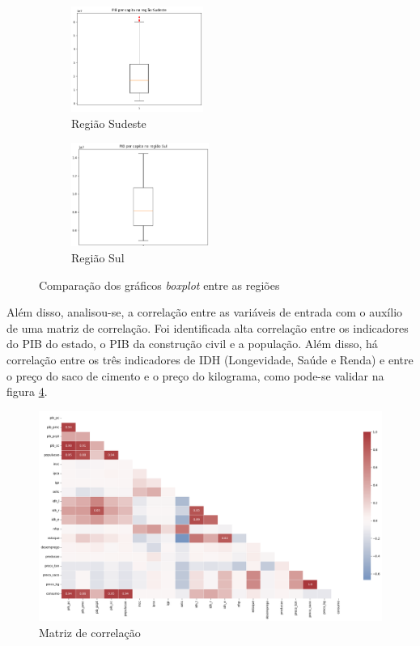 \begin{figure}[H]
    \begin{subfigure}{5cm}
        \centering 
        \includegraphics[width=4.3cm]{../figuras/graficos/boxplot-pib-cc-se.png}
        \caption{Região Sudeste}
        \label{fig:boxplot-se}
    \end{subfigure}
    \begin{subfigure}{5cm}
        \centering 
        \includegraphics[width=4.5cm]{../figuras/graficos/boxplot-pib-cc-s.png}
        \caption{Região Sul}
        \label{fig:boxplot-s}
    \end{subfigure}
    \caption{Comparação dos gráficos \textit{boxplot} entre as regiões}
  \end{figure}

Além disso, analisou-se, a correlação entre as variáveis de entrada com o auxílio 
de uma matriz de correlação. Foi identificada
alta correlação entre os indicadores do PIB do estado, o PIB da construção
civil e a população. Além disso, há correlação entre os três indicadores
de IDH (Longevidade, Saúde e Renda) e entre o preço do saco de cimento e o preço do kilograma, como pode-se
validar na figura \ref{fig:matriz-corr}.

\begin{figure}[H]
    \centering
    \includegraphics[width=13cm]{../figuras/graficos/matriz-corr.png}
    \caption{Matriz de correlação}
    \label{fig:matriz-corr}
\end{figure}

